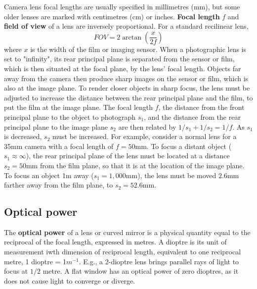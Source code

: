 \documentclass[10pt]{article}
\begin{document}
\begin{multicols}{2}
Camera lens focal lengths are usually specified in millimetres (mm), but some older lenses are marked with centimetres (cm) or inches.
\textbf{Focal length} $f$ and \textbf{field of view} of a lens are inversely proportional. For a standard recilinear lens,
\begin{equation}
    FOV = 2\arctan(\frac{x}{2f})
    \label{eq:fov}
\end{equation}
where $x$ is the width of the film or imaging sensor. When a photographic lens is set to "infinity", its rear principal plane is separated from the sensor or film, which is then situated at the focal plane, by the lens' focal length. Objects far away from the camera then produce sharp images on the sensor or film, which is also at the image plane.
\newline \newline
To render closer objects in sharp focus, the lens must be adjusted to increase the distance between the rear principal plane and the film, to put the film at the image plane. The focal length $f$, the distance from the front principal plane to the object to photograph $s_1$, and the distance from the rear principal plane to the image plane $s_2$ are then related by \(1/s_1 + 1/s_2 = 1/f\).
As $s_1$ is decreased, $s_2$ must be increased. For example, consider a normal lens for a 35mm camera with a focal length of $f=50$mm. To focus a distant object ($s_1 \approx \infty$), the rear principal plane of the lens must be located at a distance $s_2=50$mm from the film plane, so that it is at the location of the image plane. To focus an object 1m away ($s_1 = 1,000$mm), the lens must be moved 2.6mm farther away from the film plane, to $s_2=52.6$mm.

\subsection{Optical power}

The \textbf{optical power} of a lens or curved mirror is a physical quantity equal to the reciprocal of the focal length, expressed in metres. A dioptre is its unit of measurement iwth dimension of reciprocal length, equivalent to one reciprocal metre, 1 dioptre = 1$m^{-1}$. E.g., a 2-dioptre lens brings parallel rays of light to focus at $1/2$ metre. A flat window has an optical power of zero dioptres, as it does not cause light to converge or diverge.


\end{multicols}
\end{document}
